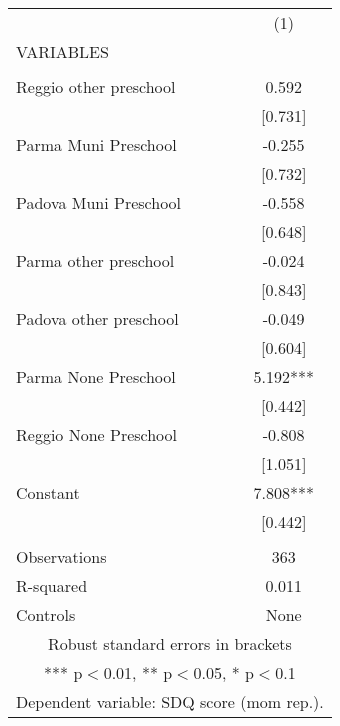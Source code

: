 \begin{tabular}{lc} \hline
 & (1) \\
VARIABLES &  \\ \hline
 &  \\
Reggio other preschool & 0.592 \\
 & [0.731] \\
Parma Muni Preschool & -0.255 \\
 & [0.732] \\
Padova Muni Preschool & -0.558 \\
 & [0.648] \\
Parma other preschool & -0.024 \\
 & [0.843] \\
Padova other preschool & -0.049 \\
 & [0.604] \\
Parma None Preschool & 5.192*** \\
 & [0.442] \\
Reggio None Preschool & -0.808 \\
 & [1.051] \\
Constant & 7.808*** \\
 & [0.442] \\
 &  \\
Observations & 363 \\
R-squared & 0.011 \\
 Controls & None \\ \hline
\multicolumn{2}{c}{ Robust standard errors in brackets} \\
\multicolumn{2}{c}{ *** p$<$0.01, ** p$<$0.05, * p$<$0.1} \\
\multicolumn{2}{c}{ Dependent variable: SDQ score (mom rep.).} \\
\end{tabular}
